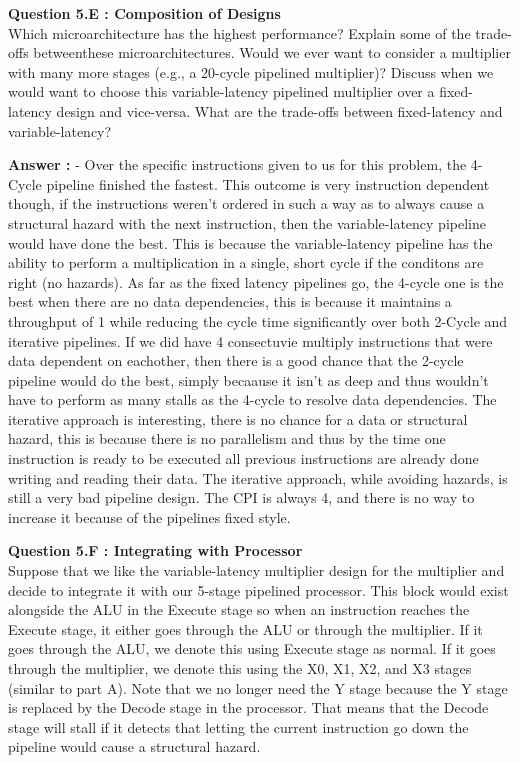 \documentclass[a4paper,11pt]{article}
\newcommand{\answer}{\textbf{Answer : }}
\begin{document}
\item \textbf{Question 5.E : Composition of Designs} \\
  Which microarchitecture has the highest performance? Explain some of the trade-offs betweenthese microarchitectures. Would we ever want to consider a multiplier with many more stages (e.g., a 20-cycle pipelined multiplier)? Discuss when we would want to choose this variable-latency pipelined multiplier over a fixed-latency design and vice-versa. What are the trade-offs between fixed-latency and variable-latency?

  \answer - Over the specific instructions given to us for this problem, the 4-Cycle pipeline finished the fastest. This outcome is very instruction dependent though, if the instructions weren't ordered in such a way as to always cause a structural hazard with the next instruction, then the variable-latency pipeline would have done the best. This is because the variable-latency pipeline has the ability to perform a multiplication in a single, short cycle if the conditons are right (no hazards). As far as the fixed latency pipelines go, the 4-cycle one is the best when there are no data dependencies, this is because it maintains a throughput of 1 while reducing the cycle time significantly over both 2-Cycle and iterative pipelines. If we did have 4 consectuvie multiply instructions that were data dependent on eachother, then there is a good chance that the 2-cycle pipeline would do the best, simply becaause it isn't as deep and thus wouldn't have to perform as many stalls as the 4-cycle to resolve data dependencies. The iterative approach is interesting, there is no chance for a data or structural hazard, this is because there is no parallelism and thus by the time one instruction is ready to be executed all previous instructions are already done writing and reading their data. The iterative approach, while avoiding hazards, is still a very bad pipeline design. The CPI is always 4, and there is no way to increase it because of the pipelines fixed style. 

\item \textbf{Question 5.F : Integrating with Processor} \\

Suppose that we like the variable-latency multiplier design for the multiplier and decide to integrate it with our 5-stage pipelined processor. This block would exist alongside the ALU in the Execute stage so when an instruction reaches the Execute stage, it either goes through the ALU or through the multiplier. If it goes through the ALU, we denote this using Execute stage as normal. If it goes through the multiplier, we denote this using the X0, X1, X2, and X3 stages (similar to part A). Note that we no longer need the Y stage because the Y stage is replaced by the Decode stage in the processor. That means that the Decode stage will stall if it detects that letting the current instruction go down the pipeline would cause a structural hazard. \\
\end{document}
